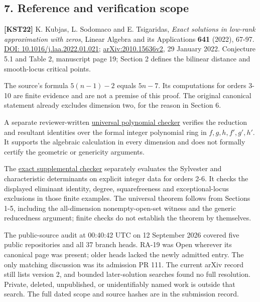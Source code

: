 \documentclass[10pt,a4paper]{article}
\begin{document}
\subsection{7. Reference and verification
scope}\label{reference-and-verification-scope}

\textbf{{[}KST22{]}} K. Kubjas, L. Sodomaco and E. Tsigaridas,
\emph{Exact solutions in low-rank approximation with zeros}, Linear
Algebra and its Applications \textbf{641} (2022), 67-97.
\href{https://doi.org/10.1016/j.laa.2022.01.021}{DOI:
10.1016/j.laa.2022.01.021};
\href{https://arxiv.org/abs/2010.15636v2}{arXiv:2010.15636v2}, 29
January 2022. Conjecture 5.1 and Table 2, manuscript page 19; Section 2
defines the bilinear distance and smooth-locus critical points.

The source's formula \(5(n-1)-2\) equals \(5n-7\). Its computations for
orders 3-10 are finite evidence and are not a premise of this proof. The
original canonical statement already excludes dimension two, for the
reason in Section 6.

A separate reviewer-written
\href{https://github.com/ajt60gaibb/OpenProblemsInNLA/blob/main/references/stepaniants-ra19-2026-09-11/verification/independent-review/universal_algebra_check.py}{universal
polynomial checker} verifies the reduction and resultant identities over
the formal integer polynomial ring in \(f,g,h,f',g',h'\). It supports
the algebraic calculation in every dimension and does not formally
certify the geometric or genericity arguments.

The
\href{https://github.com/ajt60gaibb/OpenProblemsInNLA/blob/main/references/stepaniants-ra19-2026-09-11/verification/exact_check.py}{exact
supplemental checker} separately evaluates the Sylvester and
characteristic determinants on explicit integer data for orders 2-6. It
checks the displayed eliminant identity, degree, squarefreeness and
exceptional-locus exclusions in those finite examples. The universal
theorem follows from Sections 1-5, including the all-dimension
nonempty-open-set witness and the generic reducedness argument; finite
checks do not establish the theorem by themselves.

The public-source audit at 00:40:42 UTC on 12 September 2026 covered
five public repositories and all 37 branch heads. RA-19 was Open
wherever its canonical page was present; older heads lacked the newly
admitted entry. The only matching discussion was its admission PR 111.
The current arXiv record still lists version 2, and bounded
later-solution searches found no full resolution. Private, deleted,
unpublished, or unidentifiably named work is outside that search. The
full dated scope and source hashes are in the submission record.
\end{document}
